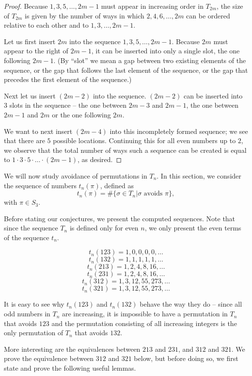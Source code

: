 \documentclass[11pt,letterpaper,twoside,english]{article}
\theoremstyle{theorem}
\theoremstyle{remark}
\begin{document}
\begin{proof}
Because $1,3,5,\ldots,2m-1$ must appear in increasing order in $T_{2m}$, the size of $T_{2m}$ is given by the number of ways in which $2, 4, 6, \ldots, 2m$ can be ordered relative to each other and to $1, 3, \ldots, 2m-1$.

Let us first insert $2m$ into the sequence $1,3,5,\ldots,2m-1$. Because $2m$ must appear to the right of $2m-1$, it can be inserted into only a single slot, the one following $2m-1$. (By ``slot'' we mean a gap between two existing elements of the sequence, or the gap that follows the last element of the sequence, or the gap that precedes the first element of the sequence.)

Next let us insert $(2m-2)$ into the sequence. $(2m-2)$ can be inserted into $3$ slots in the sequence -- the one between $2m-3$ and $2m-1$, the one between $2m-1$ and $2m$ or the one following $2m$.

We want to next insert $(2m-4)$ into this incompletely formed sequence; we see that there are $5$ possible locations. Continuing this for all even numbers up to $2$, we observe that the total number of ways such a sequence can  be created is equal to $1 \cdot 3 \cdot 5 \cdot \ldots \cdot (2m-1)$, as desired.
\end{proof}

We will now study avoidance of permutations in $T_n$. In this section, we consider the sequence of numbers $t_n(\pi)$, defined as 
\[t_n(\pi)=\#\{\sigma\in T_n|\sigma \text{ avoids } \pi\},\]
with $\pi\in S_3$.

Before stating our conjectures, we present the computed sequences. Note that since the sequence $T_n$ is defined only for even $n$, we only present the even terms of the sequence $t_n$.

$$t_n(123) = 1, 0, 0, 0, 0, \ldots$$
$$t_n(132) = 1, 1, 1, 1, 1, \ldots$$
$$t_n(213) = 1, 2, 4, 8, 16, \ldots$$
$$t_n(231) = 1, 2, 4, 8, 16, \ldots$$
$$t_n(312) = 1, 3, 12, 55, 273, \ldots$$
$$t_n(321) = 1, 3, 12, 55, 273, \ldots$$

It is easy to see why $t_n(123)$ and $t_n(132)$ behave the way they do -- since all odd numbers in $T_n$ are increasing, it is impossible to have a permutation in $T_n$ that avoids $123$ and the permutation consisting of all increasing integers is the only permutation of $T_n$ that avoids $132$.

More interesting are the equivalences between $213$ and $231$, and $312$ and $321$. We  prove the equivalence between $312$ and $321$ below, but before doing so, we first state and prove the following useful lemmas.
\end{document}
